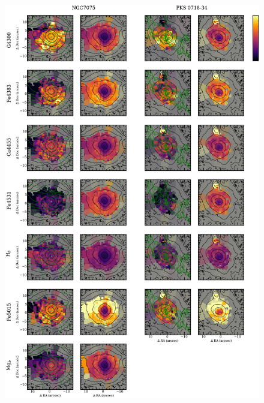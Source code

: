 {{\begin{figure}
			\includegraphics[height=0.94\textheight]{chapter4/vimos/abs5.png}
		\end{figure}

}}
